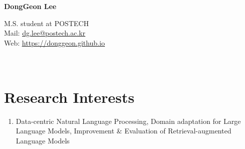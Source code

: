 \documentclass[letterpaper,11pt]{article}
\begin{document}
    \pagestyle{fancy}
    \thispagestyle{fancy}
    
    \begin{center}
        {\LARGE{\bf{DongGeon Lee}}\\}
    \end{center}
    
    \vspace{-14pt}
    
    \begin{center} 
        {M.S. student at POSTECH \\}
        {Mail: \underline{\href{mailto:dg.lee@postech.ac.kr}{dg.lee@postech.ac.kr}} \\}
        {Web: \underline{\href{https://donggeon.github.io/}{https://donggeon.github.io}}}
    \end{center}

    \section{\\Research Interests}
    \begin{enumerate}[noitemsep, leftmargin=*,label={}]
    \item{Data-centric Natural Language Processing, Domain adaptation for Large Language Models, Improvement \& Evaluation of Retrieval-augmented Language Models}
    \end{enumerate}
    
\end{document}

